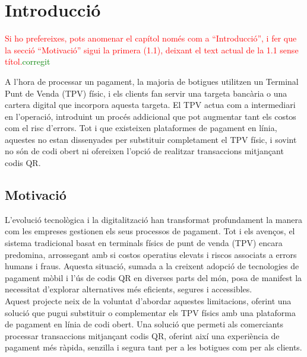 \documentclass[a4paper,12pt,twoside]{ThesisStyle}
\newcommand{\pau}[1]{\textcolor{red}{#1}}
\newcommand{\sudan}[1]{\textcolor{green}{#1}}
\begin{document}
\tableofcontents

\listoffigures

\listoftables

\mainmatter



\chapter{Introducció}
\label{chp:Introducció}

\pau{Si ho prefereixes, pots anomenar el capítol només com a ``Introducció'', i fer que la secció ``Motivació'' sigui la primera (1.1), deixant el text actual de la 1.1 sense títol.}\sudan{corregit}


A l'hora de processar un pagament, la majoria de botigues utilitzen un Terminal Punt de Venda (TPV) físic, i els clients fan servir una targeta bancària o una cartera digital que incorpora aquesta targeta. El TPV actua com a intermediari en l'operació, introduint un procés addicional que pot augmentar tant els costos com el risc d'errors. Tot i que existeixen plataformes de pagament en línia, aquestes no estan dissenyades per substituir completament el TPV físic, i sovint no són de codi obert ni ofereixen l'opció de realitzar transaccions mitjançant codis QR.

\section{Motivació}
\label{sec:Motivacio}

L'evolució tecnològica i la digitalització han transformat profundament la manera com les empreses gestionen els seus processos de pagament. Tot i els avenços, el sistema tradicional basat en terminals físics de punt de venda (TPV) encara predomina, arrossegant amb si costos operatius elevats i riscos associats a errors humans i fraus. Aquesta situació, sumada a la creixent adopció de tecnologies de pagament mòbil i l'ús de codis QR en diverses parts del món, posa de manifest la necessitat d'explorar alternatives més eficients, segures i accessibles.\\

Aquest projecte neix de la voluntat d'abordar aquestes limitacions, oferint una solució que pugui substituir o complementar els TPV físics amb una plataforma de pagament en línia de codi obert. Una solució que permeti als comerciants processar transaccions mitjançant codis QR, oferint així una experiència de pagament més ràpida, senzilla i segura tant per a les botigues com per als clients.\\
\end{document}
